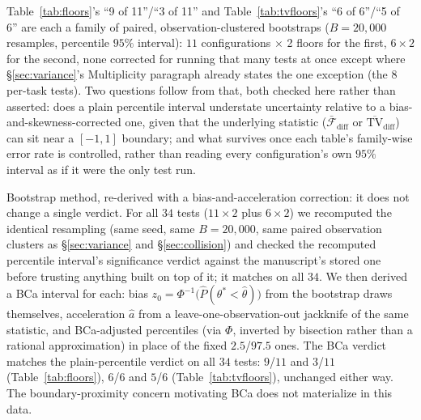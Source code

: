 Table~\ref{tab:floors}'s ``9 of 11''/``3 of 11'' and Table~\ref{tab:tvfloors}'s ``6 of 6''/``5 of 6'' are each a family of paired, observation-clustered bootstraps ($B{=}20{,}000$ resamples, percentile $95\%$ interval): $11$ configurations $\times$ 2 floors for the first, $6\times 2$ for the second, none corrected for running that many tests at once except where \S\ref{sec:variance}'s Multiplicity paragraph already states the one exception (the $8$ per-task tests). Two questions follow from that, both checked here rather than asserted: does a plain percentile interval understate uncertainty relative to a bias-and-skewness-corrected one, given that the underlying statistic ($\bar{\mathcal{F}}_{\text{diff}}$ or $\overline{\text{TV}}_{\text{diff}}$) can sit near a $[-1,1]$ boundary; and what survives once each table's family-wise error rate is controlled, rather than reading every configuration's own $95\%$ interval as if it were the only test run.

Bootstrap method, re-derived with a bias-and-acceleration correction: it does not change a single verdict. For all $34$ tests ($11\!\times\!2$ plus $6\!\times\!2$) we recomputed the identical resampling (same seed, same $B{=}20{,}000$, same paired observation clusters as \S\ref{sec:variance} and \S\ref{sec:collision}) and checked the recomputed percentile interval's significance verdict against the manuscript's stored one before trusting anything built on top of it; it matches on all $34$. We then derived a BCa interval for each: bias $z_0 = \Phi^{-1}\!\bigl(\hat P(\theta^{*}<\hat\theta)\bigr)$ from the bootstrap draws themselves, acceleration $\hat a$ from a leave-one-observation-out jackknife of the same statistic, and BCa-adjusted percentiles (via $\Phi$, inverted by bisection rather than a rational approximation) in place of the fixed $2.5$/$97.5$ ones. The BCa verdict matches the plain-percentile verdict on all $34$ tests: $9$/$11$ and $3$/$11$ (Table~\ref{tab:floors}), $6$/$6$ and $5$/$6$ (Table~\ref{tab:tvfloors}), unchanged either way. The boundary-proximity concern motivating BCa does not materialize in this data.


